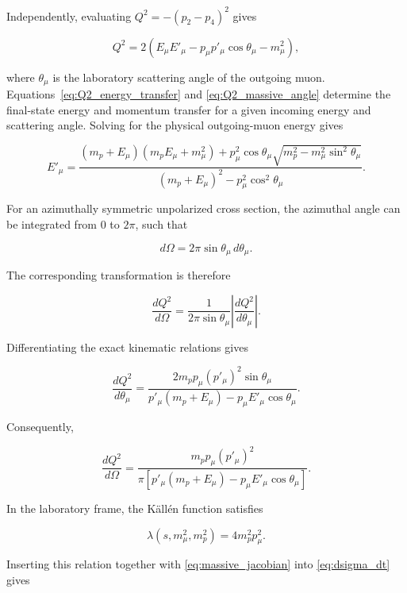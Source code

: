 Independently, evaluating \(Q^2=-(p_2-p_4)^2\) gives

\begin{equation}
Q^2
=
2\left(
E_\mu E'_\mu
-p_\mu p'_\mu\cos\theta_\mu
-m_\mu^2
\right),
\label{eq:Q2_massive_angle}
\end{equation}

where \(\theta_\mu\) is the laboratory scattering angle of the outgoing muon. Equations~\eqref{eq:Q2_energy_transfer} and \eqref{eq:Q2_massive_angle} determine the final-state energy and momentum transfer for a given incoming energy and scattering angle. Solving for the physical outgoing-muon energy gives

\begin{equation}
E'_\mu
=
\frac{
(m_p+E_\mu)(m_pE_\mu+m_\mu^2)
+p_\mu^2\cos\theta_\mu
\sqrt{m_p^2-m_\mu^2\sin^2\theta_\mu}
}{
(m_p+E_\mu)^2-p_\mu^2\cos^2\theta_\mu
}.
\label{eq:outgoing_muon_energy}
\end{equation}

For an azimuthally symmetric unpolarized cross section, the azimuthal angle can be integrated from \(0\) to \(2\pi\), such that

\begin{equation}
d\Omega
=
2\pi\sin\theta_\mu\,d\theta_\mu.
\end{equation}

The corresponding transformation is therefore

\[
\frac{dQ^2}{d\Omega}
=
\frac{1}{2\pi\sin\theta_\mu}
\left|
\frac{dQ^2}{d\theta_\mu}
\right|.
\]

Differentiating the exact kinematic relations gives

\begin{equation}
\frac{dQ^2}{d\theta_\mu}
=
\frac{
2m_p p_\mu (p'_\mu)^2\sin\theta_\mu
}{
p'_\mu(m_p+E_\mu)
-p_\mu E'_\mu\cos\theta_\mu
}.
\end{equation}

Consequently,

\begin{equation}
\frac{dQ^2}{d\Omega}
=
\frac{
m_p p_\mu (p'_\mu)^2
}{
\pi\left[
p'_\mu(m_p+E_\mu)
-p_\mu E'_\mu\cos\theta_\mu
\right]
}.
\label{eq:massive_jacobian}
\end{equation}

In the laboratory frame, the Källén function satisfies

\[
\lambda(s,m_\mu^2,m_p^2)
=
4m_p^2p_\mu^2.
\]

Inserting this relation together with \autoref{eq:massive_jacobian} into \autoref{eq:dsigma_dt} gives

